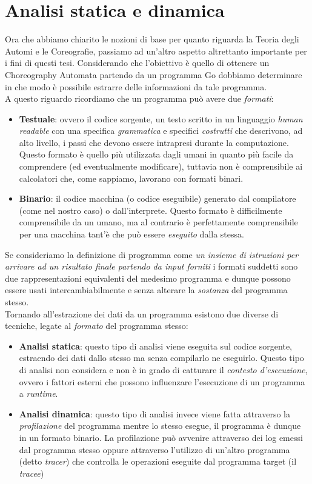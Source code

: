 \section{Analisi statica e dinamica}
Ora che abbiamo chiarito le nozioni di base per quanto riguarda la Teoria degli Automi e le Coreografie, passiamo ad un'altro aspetto altrettanto importante per i fini di questi tesi. Considerando che l'obiettivo è quello di ottenere un Choreography Automata partendo da un programma Go dobbiamo determinare in che modo è possibile estrarre delle informazioni da tale programma.\\
A questo riguardo ricordiamo che un programma può avere due \emph{formati}:
\begin{itemize}
    \item \textbf{Testuale}: ovvero il codice sorgente, un testo scritto in un linguaggio \emph{human readable} con una specifica \emph{grammatica} e specifici \emph{costrutti} che descrivono, ad alto livello, i passi che devono essere intrapresi durante la computazione. Questo formato è quello più utilizzata dagli umani in quanto più facile da comprendere (ed eventualmente modificare), tuttavia non è comprensibile ai calcolatori che, come sappiamo, lavorano con formati binari.
    \item \textbf{Binario}: il codice macchina (o codice eseguibile) generato dal compilatore (come nel nostro caso) o dall'interprete. Questo formato è difficilmente comprensibile da un umano, ma al contrario è perfettamente comprensibile per una macchina tant'è che può essere \emph{eseguito} dalla stessa.
\end{itemize}
Se consideriamo la definizione di programma come \emph{un insieme di istruzioni per arrivare ad un risultato finale partendo da input forniti} i formati suddetti sono due rappresentazioni equivalenti del medesimo programma e dunque possono essere usati intercambiabilmente e senza alterare la \emph{sostanza} del programma stesso. \bigskip \\
Tornando all'estrazione dei dati da un programma esistono due diverse di tecniche, legate al \emph{formato} del programma stesso:
\begin{itemize}
    \item \textbf{Analisi statica}: questo tipo di analisi viene eseguita sul codice sorgente, estraendo dei dati dallo stesso ma senza compilarlo ne eseguirlo. Questo tipo di analisi non considera e non è in grado di catturare il \emph{contesto d'esecuzione}, ovvero i fattori esterni che possono influenzare l'esecuzione di un programma a \emph{runtime}.
    \item \textbf{Analisi dinamica}: questo tipo di analisi invece viene fatta attraverso la \emph{profilazione} del programma mentre lo stesso esegue, il programma è dunque in un formato binario. La profilazione può avvenire attraverso dei log emessi dal programma stesso oppure attraverso l'utilizzo di un'altro programma (detto \emph{tracer}) che controlla le operazioni eseguite dal programma target (il \emph{tracee})
\end{itemize}
